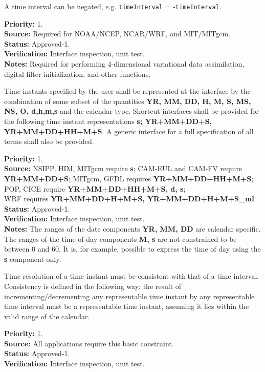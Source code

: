 A time interval can be negated, e.g. {\tt timeInterval} = -{\tt timeInterval}.
\begin{reqlist}
{\bf Priority:} 1. \\
{\bf Source:} Required for NOAA/NCEP, NCAR/WRF, and MIT/MITgcm. \\
{\bf Status:} Approved-1. \\
{\bf Verification:} Interface inspection, unit test. \\
{\bf Notes:} Required for performing 4-dimensional variational data assimilation, digital filter initialization, and other functions.
\end{reqlist}

\label{req:time_instants}
\label{req:ti}

Time instants specified by the user shall be represented at the interface by the 
combination of some subset of the quantities {\bf YR, MM, DD, H, M, S, MS, NS, O,
d,h,m,s} 
and the calendar type.  Shortcut interfaces shall be provided for the following time 
instant representations {\bf s; YR+MM+DD+S, YR+MM+DD+HH+M+S}. A generic interface for a 
full specification of all terms shall also be provided.
\begin{reqlist}
{\bf Priority:} 1. \\
{\bf Source:} NSIPP, HIM, MITgcm require {\bf s}; 
CAM-EUL and CAM-FV require {\bf YR+MM+DD+S};
MITgcm, GFDL requires {\bf YR+MM+DD+HH+M+S}; 
POP, CICE require {\bf YR+MM+DD+HH+M+S, d, s}; \\
WRF requires {\bf YR+MM+DD+H+M+S, YR+MM+DD+H+M+S\_nd} \\
{\bf Status:} Approved-1. \\
{\bf Verification:} Interface inspection, unit test. \\
{\bf Notes:} The ranges of the date components {\bf YR, MM, DD} are
calendar specific.  The ranges of the time of day components {\bf M, s} are
not constrained to be between 0 and 60.  It is, for example, possible to
express the time of day using the {\bf s} component only.  
\end{reqlist}

Time resolution of a time instant must be consistent with that of a time interval.
Consistency is defined in the following way:  the result of incrementing/decrementing 
any representable time instant by any representable time interval must be a representable 
time instant, assuming it lies within the valid range of the calendar.
\begin{reqlist}
{\bf Priority:} 1. \\
{\bf Source:} All applications require this basic constraint.\\
{\bf Status:} Approved-1. \\
{\bf Verification:} Interface inspection, unit test. 
\end{reqlist}

